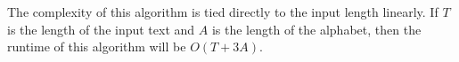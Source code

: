



The complexity of this algorithm is tied directly to the input length linearly. If $T$ is the length of the input text and $A$ is the length of the alphabet, then the runtime of this algorithm will be $O(T + 3A)$. 

